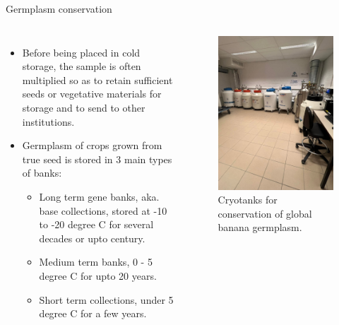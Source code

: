 \documentclass[11pt,ignorenonframetext,aspectratio=169]{beamer}
\begin{document}
\begin{frame}{Germplasm conservation}
\protect\hypertarget{germplasm-conservation}{}
\begin{columns}[T, onlytextwidth]

\footnotesize
\begin{itemize}
\item Before being placed in cold storage, the sample is often multiplied so as to retain sufficient seeds or vegetative materials for storage and to send to other institutions.
\item Germplasm of crops grown from true seed is stored in 3 main types of banks:
  \begin{itemize}
  \footnotesize
  \item Long term gene banks, aka. base collections, stored at -10 to -20 degree C for several decades or upto century.
  \item Medium term banks, 0 - 5 degree C for upto 20 years.
  \item Short term collections, under 5 degree C for a few years.
  \end{itemize}
\end{itemize}


\begin{figure}
\includegraphics[width=0.6\linewidth]{./images/cryo-tanks-banana} \caption{Cryotanks for conservation of global banana germplasm.}\label{fig:cryo-tank-banana}
\end{figure}

\end{columns}
\end{frame}
\end{document}
